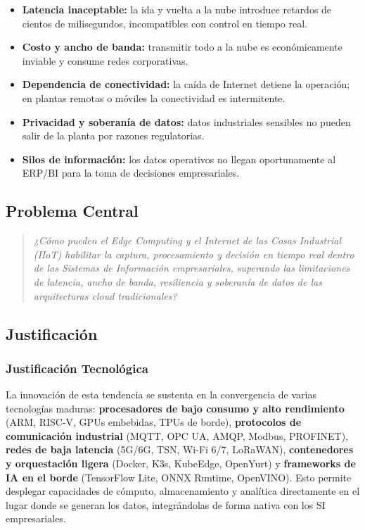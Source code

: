 ﻿\documentclass[12pt,a4paper,oneside]{article}
\begin{document}
\begin{itemize}[leftmargin=*]
    \item \textbf{Latencia inaceptable:} la ida y vuelta a la nube introduce retardos de cientos de milisegundos, incompatibles con control en tiempo real.
    \item \textbf{Costo y ancho de banda:} transmitir todo a la nube es económicamente inviable y consume redes corporativas.
    \item \textbf{Dependencia de conectividad:} la caída de Internet detiene la operación; en plantas remotas o móviles la conectividad es intermitente.
    \item \textbf{Privacidad y soberanía de datos:} datos industriales sensibles no pueden salir de la planta por razones regulatorias.
    \item \textbf{Silos de información:} los datos operativos no llegan oportunamente al ERP/BI para la toma de decisiones empresariales.
\end{itemize}

\subsection{Problema Central}

\begin{quote}
\textit{¿Cómo pueden el Edge Computing y el Internet de las Cosas Industrial (IIoT) habilitar la captura, procesamiento y decisión en tiempo real dentro de los Sistemas de Información empresariales, superando las limitaciones de latencia, ancho de banda, resiliencia y soberanía de datos de las arquitecturas cloud tradicionales?}
\end{quote}

\subsection{Justificación}

\subsubsection{Justificación Tecnológica}

La innovación de esta tendencia se sustenta en la convergencia de varias tecnologías maduras: \textbf{procesadores de bajo consumo y alto rendimiento} (ARM, RISC-V, GPUs embebidas, TPUs de borde), \textbf{protocolos de comunicación industrial} (MQTT, OPC UA, AMQP, Modbus, PROFINET), \textbf{redes de baja latencia} (5G/6G, TSN, Wi-Fi 6/7, LoRaWAN), \textbf{contenedores y orquestación ligera} (Docker, K3s, KubeEdge, OpenYurt) y \textbf{frameworks de IA en el borde} (TensorFlow Lite, ONNX Runtime, OpenVINO). Esto permite desplegar capacidades de cómputo, almacenamiento y analítica directamente en el lugar donde se generan los datos, integrándolas de forma nativa con los SI empresariales.
\end{document}
